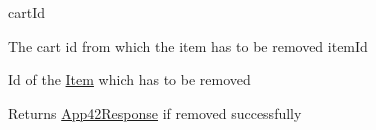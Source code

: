cart\+Id
\begin{DoxyItemize}
\item The cart id from which the item has to be removed  item\+Id
\item Id of the \hyperlink{class_item}{Item} which has to be removed
\end{DoxyItemize}

\begin{DoxyReturn}{Returns}
\hyperlink{class_app42_response}{App42\+Response} if removed successfully 
\end{DoxyReturn}
